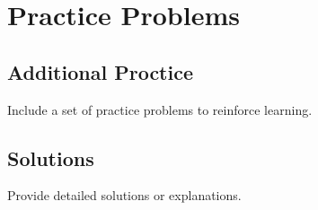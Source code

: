 \section{Practice Problems}
\subsection*{Additional Proctice}
Include a set of practice problems to reinforce learning.
\subsection*{Solutions}
Provide detailed solutions or explanations.